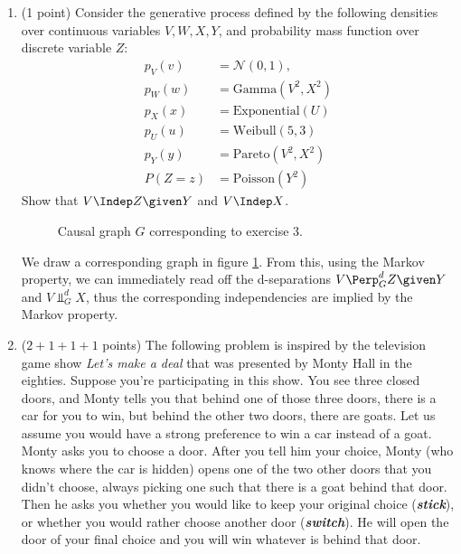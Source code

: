 \begin{enumerate}
\item (1 point) Consider the generative process defined by the following densities over continuous variables $V, W, X, Y$, and probability mass function over discrete variable $Z$:
\begin{align*}
  p_V(v) &= \mathcal{N}(0,1), \\
  p_W(w) &= \text{Gamma}(V^2, X^2) \\
  p_X(x) &= \text{Exponential}(U) \\
  p_U(u) &= \text{Weibull}(5,3)\\
  p_Y(y) &= \text{Pareto}(V^2, X^2) \\
  P(Z=z) &= \text{Poisson}(Y^2)
\end{align*}
Show that $V \Indep Z \given Y$ and $V \Indep X$.

\begin{gradedsolution}
  \begin{figure}[ht]
    \centering
    \caption{Causal graph $G$ corresponding to exercise 3.}
    \label{fig:three}
  \end{figure}
  We draw a corresponding graph in figure \ref{fig:three}. From this, using the Markov property, we can immediately read off the d-separations $V \Perp^d_G Z \given Y$ and $V \Perp^d_G X$, thus the corresponding independencies are implied by the Markov property.
\end{gradedsolution}

\item ($2 + 1 + 1 + 1$ points) The following problem is inspired by the television game show \emph{Let's make a
deal} that was presented by Monty Hall in the eighties. Suppose you're
participating in this show. You see three closed doors, and Monty tells you
that behind one of those three doors, there is a car for you to win, but behind
the other two doors, there are goats. Let us assume you would have a
strong preference to win a car instead of a goat.
Monty asks you to choose a door. After you tell him your choice, Monty (who
knows where the car is hidden) opens one of the two other doors that you didn't
choose, always picking one such that there is a goat behind that door. Then he asks you
whether you would like to keep your original choice (\textbf{\emph{stick}}), or whether you would
rather choose another door (\textbf{\emph{switch}}). He will open the door of your final choice and you
will win whatever is behind that door.


\end{enumerate}
